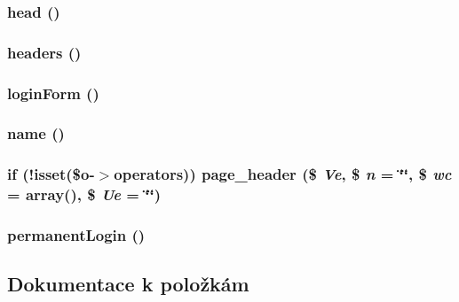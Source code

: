 \subsubsection[{head}]{\setlength{\rightskip}{0pt plus 5cm}head ()}\label{dc/d64/class_adminer_ab4bb77d19c2f3d6b53e20be06e3515bd}
\subsubsection[{headers}]{\setlength{\rightskip}{0pt plus 5cm}headers ()}\label{dc/d64/class_adminer_acf17788084df5a3d3415f4d9e346471d}
\subsubsection[{loginForm}]{\setlength{\rightskip}{0pt plus 5cm}loginForm ()}\label{dc/d64/class_adminer_a82bd519619b38f88763e0ecc29ba4630}
\subsubsection[{name}]{\setlength{\rightskip}{0pt plus 5cm}name ()}\label{dc/d64/class_adminer_a4b516aaa5fa38da4fed24ab6001627e2}
\subsubsection[{page\_\-header}]{\setlength{\rightskip}{0pt plus 5cm}if (!isset(\$o-\/$>$operators)) page\_\-header (\$ {\em Ve}, \/  \$ {\em n} = {\ttfamily \char`\"{}\char`\"{}}, \/  \$ {\em wc} = {\ttfamily array()}, \/  \$ {\em Ue} = {\ttfamily \char`\"{}\char`\"{}})}\label{dc/d64/class_adminer_a5a223d9cae89bd6b4572e1e2404cbde7}
\subsubsection[{permanentLogin}]{\setlength{\rightskip}{0pt plus 5cm}permanentLogin ()}\label{dc/d64/class_adminer_a6bfb91ef00404cf87d548e2f3357dc7e}


\subsection{Dokumentace k položkám}

